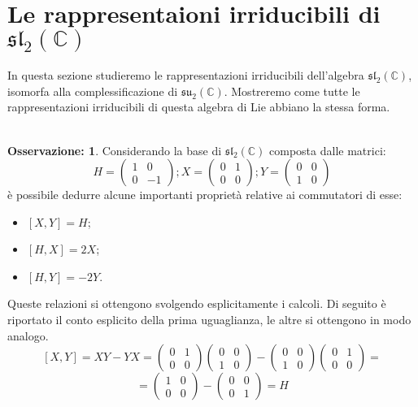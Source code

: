 \documentclass[12pt,a4paper]{report}
\theoremstyle{definition}
\theoremstyle{Theorem}
\theoremstyle{definition}
\theoremstyle{definition}
\theoremstyle{definition}
\newtheorem{Obs}[Def]{Osservazione:}
\begin{document}
\section{Le rappresentaioni irriducibili di $\mathfrak{sl_2(\mathbb{C})}$}
In questa sezione studieremo le rappresentazioni irriducibili dell'algebra $\mathfrak{sl_2(\mathbb{C})}$, isomorfa alla complessificazione di $\mathfrak{su_2(\mathbb{C})}$. Mostreremo come tutte le rappresentazioni irriducibili di questa algebra di Lie abbiano la stessa forma.\\
\\
\begin{Obs}\label{Obs1}
	Considerando la base di $\mathfrak{sl_2(\mathbb{C})}$ composta dalle matrici: $$H=
	\begin{pmatrix}
		1&0\\
		0&-1
	\end{pmatrix}; 
	X=\begin{pmatrix}
		0&1\\
		0&0
	\end{pmatrix};
	Y=\begin{pmatrix}
		0&0\\
		1&0
	\end{pmatrix}$$
è possibile dedurre alcune importanti proprietà relative ai commutatori di esse:
\begin{itemize}
	\item $[X,Y]=H$;
	\item $[H,X]=2X$;
	\item $[H,Y]=-2Y$.
\end{itemize}
Queste relazioni si ottengono svolgendo esplicitamente i calcoli. Di seguito è riportato il conto esplicito della prima uguaglianza, le altre si ottengono in modo analogo.
$$[X,Y]=XY-YX=\begin{pmatrix}
	0&1\\
	0&0
\end{pmatrix}
\begin{pmatrix}
	0&0\\
	1&0
\end{pmatrix}-
\begin{pmatrix}
	0&0\\
	1&0
\end{pmatrix}
\begin{pmatrix}
	0&1\\
	0&0
\end{pmatrix}=$$$$=
\begin{pmatrix}
1&0\\
0&0
\end{pmatrix}-\begin{pmatrix}
0&0\\
0&1
\end{pmatrix}=H$$
\end{Obs}
\end{document}
